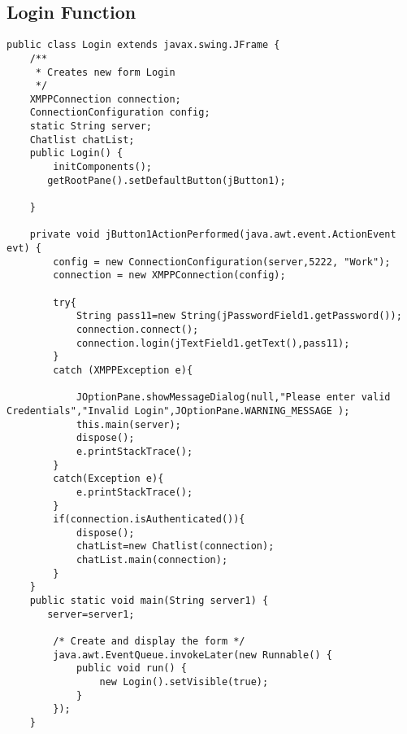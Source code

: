 \documentclass{SureshLimkar}
\begin{document}
\subsection{Login Function}
\begin{lstlisting}
public class Login extends javax.swing.JFrame {
    /**
     * Creates new form Login
     */
    XMPPConnection connection;
    ConnectionConfiguration config;
    static String server;
    Chatlist chatList;
    public Login() {
        initComponents();
       getRootPane().setDefaultButton(jButton1);
        
    }
  
    private void jButton1ActionPerformed(java.awt.event.ActionEvent evt) {         
    	config = new ConnectionConfiguration(server,5222, "Work");
		connection = new XMPPConnection(config);
			  
		try{
			String pass11=new String(jPasswordField1.getPassword());
			connection.connect();
			connection.login(jTextField1.getText(),pass11);
        } 
        catch (XMPPException e){
					
        	JOptionPane.showMessageDialog(null,"Please enter valid Credentials","Invalid Login",JOptionPane.WARNING_MESSAGE );
            this.main(server);
            dispose();
			e.printStackTrace();
		}
		catch(Exception e){
			e.printStackTrace();
	  	}
        if(connection.isAuthenticated()){
            dispose();
		    chatList=new Chatlist(connection);
		    chatList.main(connection);
        }
    }
  	public static void main(String server1) {
       server=server1;

        /* Create and display the form */
        java.awt.EventQueue.invokeLater(new Runnable() {
            public void run() {
                new Login().setVisible(true);
            }
        });
    }
\end{lstlisting}

\newpage
\end{document}
